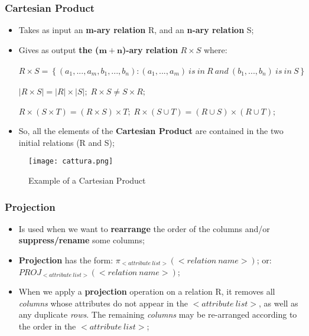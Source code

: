 \documentclass{article}
\begin{document}
\subsubsection{Cartesian Product}
\begin{itemize}
\item Takes as input an\textbf{ m-ary relation} R, and an\textbf{ n-ary relation} S;
\item Gives as output \textbf{the ($\mathbf{m+n}$)-ary relation} $R \times S$ where:\\\\
$R \times S = \left \{ (a_{1},...,a_{m},b_{1},...,b_{n}): (a_{1},...,a_{m})\: is\: in\: R\: and\:(b_{1},...,b_{n})\: is\: in\: S \right \}$
\\\\
$|R \times S| = |R| \times |S|;\; R \times S \neq S \times R; $
\\\\
$R \times (S \times T) = (R \times S) \times T;\; R \times (S \cup T) = (R \cup S) \times (R \cup T); $
\item So, all the elements of the \textbf{Cartesian Product} are contained in the two initial relations (R and S);
\end{itemize}
\begin{figure}[H]
  \centering
  \texttt{[image: cattura.png]}
  \caption{Example of a Cartesian Product}
\end{figure}
\newpage
\subsubsection{Projection}
\begin{itemize}
\item Is used when we want to \textbf{rearrange} the order of the columns and/or \textbf{suppress/rename} some columns;
\item \textbf{Projection} has the form: $\pi _{<attribute\ list>}(<relation\ name>)$; or: $PROJ_{<attribute\ list>}(<relation\ name>)$;
\item When we apply a \textbf{projection} operation on a relation R, it removes all \emph{columns} whose attributes do not appear in the $<attribute\ list>$, as well as any duplicate \emph{rows}. The remaining \emph{columns} may be re-arranged according to the order in the $<attribute\ list>$;
\end{itemize}
\end{document}
